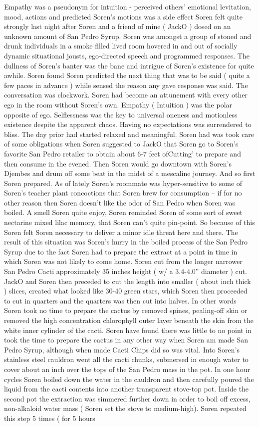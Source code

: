 \documentclass[12pt]{book}
\begin{document}
Empathy was a pseudonym for intuition - perceived others' emotional levitation, mood, actions and predicted Soren's motions was a side effect Soren felt quite strongly last night after Soren and a friend of mine ( JackO ) dosed on an unknown amount of San Pedro Syrup. Soren was amongst a group of stoned and drunk individuals in a smoke filled lived room hovered in and out of socially dynamic situational jousts, ego-directed speech and programmed responses. The dullness of Soren's banter was the bane and intrigue of Soren's existence for quite awhile. Soren found Soren predicted the next thing that was to be said ( quite a few paces in advance ) while sensed the reason any gave response was said. The conversation was clockwork. Soren had become an attunement with every other ego in the room without Soren's own. Empathy ( Intuition ) was the polar opposite of ego. Selflessness was the key to universal oneness and motionless existence despite the apparent chaos. Having no expectations was surrendered to bliss. The day prior had started relaxed and meaningful. Soren had was took care of some obligations when Soren suggested to JackO that Soren go to Soren's favorite San Pedro retailer to obtain about 6-7 feet ofCutting' to prepare and then consume in the evened. Then Soren would go downtown with Soren's Djembes and drum off some beat in the midst of a mescaline journey. And so first Soren prepared. As of lately Soren's roommate was hyper-sensitive to some of Soren's teacher plant concoctions that Soren brew for consumption -- if for no other reason then Soren doesn't like the odor of San Pedro when Soren was boiled. A smell Soren quite enjoy, Soren reminded Soren of some sort of sweet nectarine mixed lilac memory, that Soren can't quite pin-point. So because of this Soren felt Soren necessary to deliver a minor idle threat here and there. The result of this situation was Soren's hurry in the boiled process of the San Pedro Syrup due to the fact Soren had to prepare the extract at a point in time in which Soren was not likely to come home. Soren cut from the longer narrower San Pedro Cacti approximately 35 inches height ( w/ a 3.4-4.0'' diameter ) cut. JackO and Soren then preceded to cut the length into smaller ( about inch thick ) slices, created what looked like 30-40 green stars, which Soren then proceeded to cut in quarters and the quarters was then cut into halves. In other words Soren took no time to prepare the cactus by removed spines, pealing-off skin or removed the high concentration chlorophyll outer layer beneath the skin from the white inner cylinder of the cacti. Soren have found there was little to no point in took the time to prepare the cactus in any other way when Soren am made San Pedro Syrup, although when made Cacti Chips did so was vital. Into Soren's stainless steel cauldron went all the cacti chunks, submersed in enough water to cover about an inch over the tops of the San Pedro mass in the pot. In one hour cycles Soren boiled down the water in the cauldron and then carefully poured the liquid from the cacti contents into another transparent stove-top pot. Inside the second pot the extraction was simmered further down in order to boil off excess, non-alkaloid water mass ( Soren set the stove to medium-high). Soren repeated this step 5 times ( for 5 hours 
\end{document}
